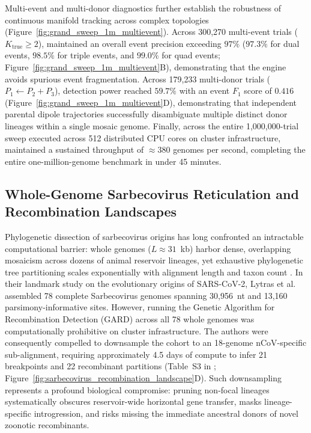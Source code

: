 Multi-event and multi-donor diagnostics further establish the robustness of continuous manifold tracking across complex topologies (Figure~\ref{fig:grand_sweep_1m_multievent}).
Across 300,270 multi-event trials ($K_{\mathrm{true}} \ge 2$), \RhizAeon maintained an overall event precision exceeding $97\%$ ($97.3\%$ for dual events, $98.5\%$ for triple events, and $99.0\%$ for quad events; Figure~\ref{fig:grand_sweep_1m_multievent}B), demonstrating that the engine avoids spurious event fragmentation.
Across 179,233 multi-donor trials ($P_1 \leftarrow P_2 + P_3$), detection power reached $59.7\%$ with an event $F_1$ score of $0.416$ (Figure~\ref{fig:grand_sweep_1m_multievent}D), demonstrating that independent parental dipole trajectories successfully disambiguate multiple distinct donor lineages within a single mosaic genome.
Finally, across the entire 1,000,000-trial sweep executed across 512 distributed CPU cores on cluster infrastructure, \RhizAeon maintained a sustained throughput of $\approx 380$ genomes per second, completing the entire one-million-genome benchmark in under 45 minutes.

\subsection{Whole-Genome Sarbecovirus Reticulation and Recombination Landscapes}
\label{subsec:sarbecovirus_origins_reanalysis}

Phylogenetic dissection of sarbecovirus origins has long confronted an intractable computational barrier: whole genomes ($L \approx 31$~kb) harbor dense, overlapping mosaicism across dozens of animal reservoir lineages, yet exhaustive phylogenetic tree partitioning scales exponentially with alignment length and taxon count \cite{boni2020evolutionary,lytras2022exploring}.
In their landmark study on the evolutionary origins of SARS-CoV-2, Lytras et al.\ \cite{lytras2022exploring} assembled 78 complete Sarbecovirus genomes spanning 30,956~nt and 13,160 parsimony-informative sites.
However, running the Genetic Algorithm for Recombination Detection (GARD) across all 78 whole genomes was computationally prohibitive on cluster infrastructure.
The authors were consequently compelled to downsample the cohort to an 18-genome nCoV-specific sub-alignment, requiring approximately 4.5 days of compute to infer 21 breakpoints and 22 recombinant partitions (Table~S3 in \cite{lytras2022exploring}; Figure~\ref{fig:sarbecovirus_recombination_landscape}D).
Such downsampling represents a profound biological compromise: pruning non-focal lineages systematically obscures reservoir-wide horizontal gene transfer, masks lineage-specific introgression, and risks missing the immediate ancestral donors of novel zoonotic recombinants.

